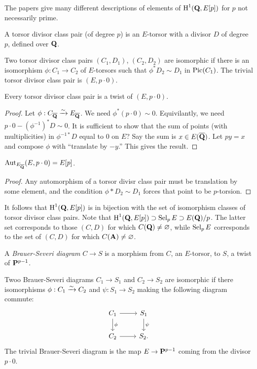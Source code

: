The papers \cite{cfnss-2008,cfnss-2009,cfnss-2014} give many different 
descriptions of elements of $\operatorname{H}^1(\mathbf{Q},E[p])$ for $p$ not necessarily prime. 

\begin{definition}
A torsor divisor class pair (of degree $p$) is an $E$-torsor with a divisor 
$D$ of degree $p$, defined over $\mathbf{Q}$. 
\end{definition}

Two torsor divisor class pairs $(C_1,D_1)$, $(C_2,D_2)$ are isomorphic if there 
is an isomorphism $\phi:C_1\to C_2$ of $E$-torsors such that 
$\phi^\ast D_2\sim D_1$ in $\operatorname{Pic}(C_1)$. The trivial torsor divisor class 
pair is $(E,p\cdot 0)$. 

\begin{lemma}
Every torsor divisor class pair is a twist of $(E,p\cdot 0)$. 
\end{lemma}
\begin{proof}
Let $\phi:C_{\overline{\mathbf{Q}}}\xrightarrow\sim E_{\overline{\mathbf{Q}}}$. We need 
$\phi^\ast(p\cdot 0)\sim 0$. Equivilantly, we need 
$p\cdot 0-(\phi^{-1})^\ast D\sim 0$. It is sufficient to show that the sum of 
points (with multiplicities) in $\phi^{-1\ast} D$ equal to $0$ on $E$? Say 
the sum is $x\in E(\overline{\mathbf{Q}})$. Let $p y=x$ and compose $\phi$ with 
``translate by $-y$.'' This gives the result. 
\end{proof}

\begin{lemma}
$\operatorname{Aut}_{E_{\overline{\mathbf{Q}}}}(E,p\cdot 0) = E[p]$. 
\end{lemma}
\begin{proof}
Any automorphism of a torsor divisr class pair must be translation by some 
element, and the condition $\phi\ast D_2\sim D_1$ forces that point to be 
$p$-torsion. 
\end{proof}

It follows that $\operatorname{H}^1(\mathbf{Q},E[p])$ is in bijection with the set of isomorphism 
classes of torsor divisor class pairs. Note that 
$\operatorname{H}^1(\mathbf{Q},E[p])\supset \operatorname{Sel}_p E\supset E(\mathbf{Q})/p$. The latter set corresponds 
to those $(C,D)$ for which $C(\mathbf{Q})\ne\varnothing$, while $\operatorname{Sel}_p E$ 
corresponds to the set of $(C,D)$ for which $C(\mathbf{A})\ne\varnothing$. 

\begin{definition}
A \emph{Brauer-Severi diagram} $C\to S$ is a morphism from $C$, an $E$-torsor, 
to $S$, a twist of $\mathbf{P}^{p-1}$. 
\end{definition}

Twoo Brauer-Severi diagrams $C_1\to S_1$ and $C_2\to S_2$ are isomorphic if 
there isomorphisms $\phi:C_1\xrightarrow\sim C_2$ and $\psi:S_1\to S_2$ making the 
following diagram commute:
\[\begin{tikzcd}
  C_1 \ar[r] \ar[d, "\phi"] 
    & S_1 \ar[d, "\psi"] \\
  C_2 \ar[r] 
    & S_2 .
\end{tikzcd}\]
The trivial Brauer-Severi diagram is the map $E\to \mathbf{P}^{p-1}$ coming from 
the divisor $p\cdot 0$. 

